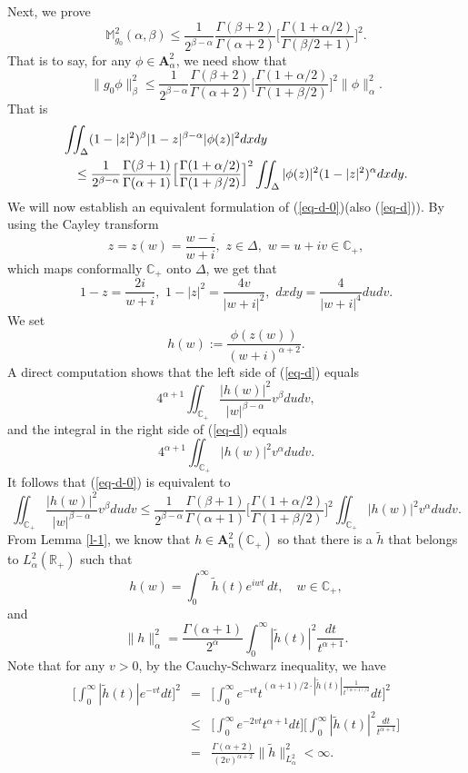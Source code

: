 \documentclass[10pt]{amsart}
\theoremstyle{definition}    %
\numberwithin{equation}{section}
\begin{document}
Next, we prove 
$$\mathbb{M}_{g_0}^2(\alpha, \beta)\leq \frac{1}{2^{\beta-\alpha}}\frac{\Gamma(\beta+2)}{\Gamma(\alpha+2)}\Big[\frac{\Gamma(1+\alpha/2)}{\Gamma(\beta/2+1)}\Big]^2.$$
That is to say, for any $\phi\in \mathbf{A}_{\alpha}^2$, we need show that
\begin{equation}\label{eq-d-0}
\|g_0\phi\|_{\beta}^2\leq \frac{1}{2^{\beta-\alpha}}\frac{\Gamma(\beta+2)}{\Gamma(\alpha+2)}\Big[\frac{\Gamma(1+\alpha/2)}{\Gamma(1+\beta/2)}\Big]^2\|\phi\|_{\alpha}^2. 
\end{equation}
That is 
\begin{eqnarray}\label{eq-d}
\lefteqn{\iint_{\Delta}(1-|z|^2)^{\beta}|1-z|^{\beta-\alpha}|\phi(z)|^2dxdy}\nonumber \\ &&\leq \frac{1}{2^{\beta-\alpha}} \frac{\Gamma(\beta+1)}{\Gamma(\alpha+1)}\Big[\frac{\Gamma(1+\alpha/2)}{\Gamma(1+\beta/2)}\Big]^2\iint_{\Delta}|\phi(z)|^2(1-|z|^2)^{\alpha}dxdy.
\end{eqnarray}
We will now establish an equivalent formulation of (\ref{eq-d-0})(also (\ref{eq-d})). By using the Cayley transform
$$z=z(w)=\frac{w-i}{w+i}, \,\,z\in \Delta,\,\, w=u+iv\in \mathbb{C}_{+},$$
which maps conformally $\mathbb{C}_{+}$ onto $\Delta$, we get that
$$1-z=\frac{2i}{w+i},\,\, 1-|z|^2=\frac{4v}{|w+i|^2},\,\, dxdy=\frac{4}{|w+i|^4}dudv.$$
We set 
$$h(w):=\frac{\phi(z(w))}{(w+i)^{\alpha+2}}.$$ A direct computation shows that the left side of  (\ref{eq-d}) equals
$$4^{\alpha+1}\iint_{\mathbb{C}_{+}}\frac{|h(w)|^2}{|w|^{\beta-\alpha}}v^{\beta}dudv,$$
and the integral in the right side of (\ref{eq-d}) equals
$$4^{\alpha+1}\iint_{\mathbb{C}_{+}}|h(w)|^2v^{\alpha}dudv.$$
It follows that (\ref{eq-d-0}) is equivalent to 
\begin{equation}\label{equi}
\iint_{\mathbb{C}_{+}}\frac{|h(w)|^2}{|w|^{\beta-\alpha}}v^{\beta}dudv \leq \frac{1}{2^{\beta-\alpha}} \frac{\Gamma(\beta+1)}{\Gamma(\alpha+1)}\Big[\frac{\Gamma(1+\alpha/2)}{\Gamma(1+\beta/2)}\Big]^2
\iint_{\mathbb{C}_{+}}|h(w)|^2v^{\alpha}dudv.
\end{equation}
From Lemma \ref{l-1}, we know that $h\in \mathbf{A}_{\alpha}^2(\mathbb{C}_{+})$ so that there is a $\widetilde{h}$ that belongs to $L_{\alpha}^2(\mathbb{R}_{+})$ such that
$$
h(w) = \int_{0}^{\infty} \tilde{h}(t) e^{i w t} \, dt, \quad w \in \mathbb{C}_{+},
$$
and 
$$
\|h\|_{\alpha}^{2} = \frac{\Gamma(\alpha+1)}{2^{\alpha}} \int_{0}^{\infty} |\tilde{h}(t)|^{2} \frac{dt}{t^{\alpha+1}}.
$$
Note that for any $v>0$, by the Cauchy-Schwarz inequality, we have 
\begin{eqnarray}\Big[\int_{0}^{\infty}|\widetilde{h}(t)|e^{-vt}dt\Big]^2&=&\Big[\int_{0}^{\infty}e^{-vt}t^{(\alpha+1)/2\cdot|\widetilde{h}(t)|\frac{1}{t^{(\alpha+1)/2}}}dt\Big]^2\nonumber\\
 &\leq&\Big[\int_{0}^{\infty}e^{-2vt}t^{\alpha+1}dt\Big]\Big[\int_{0}^{\infty}|\widetilde{h}(t)|^2 \frac{dt}{t^{\alpha+1}}\Big]\nonumber \\
&=& \frac{\Gamma(\alpha+2)}{(2v)^{\alpha+2}}\|\widetilde{h}\|_{L_{\alpha}^2}^2<\infty.\nonumber \end{eqnarray}
\end{document}
